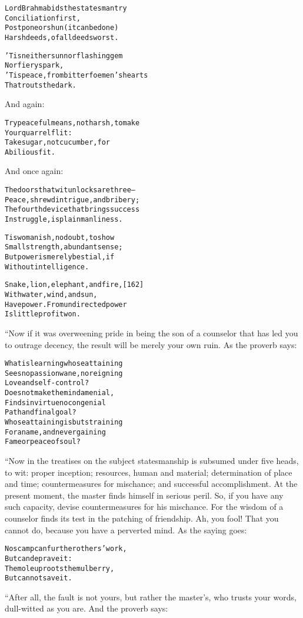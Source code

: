 \documentclass{article}
\renewenvironment{verbatim}{\begin{alltt}\normalfont\begin{centering}}{\end{centering}\end{alltt}}
\begin{document}
\begin{verbatim}
Lord Brahma bids the statesman try
    Conciliation first,
Postpone or shun (it can be done)
    Harsh deeds, of all deeds worst.

'Tis neither sun nor flashing gem
    Nor fiery spark,
'Tis peace, from bitter foemen's hearts
    That routs the dark.
\end{verbatim}
And again:

\begin{verbatim}
Try peaceful means, not harsh, to make
    Your quarrel flit:
Take sugar, not cucumber, for
    A bilious fit.
\end{verbatim}
And once again:

\begin{verbatim}
The doors that wit unlocks are three--
Peace, shrewd intrigue, and bribery;
The fourth device that brings success
In struggle, is plain manliness.

Tis womanish, no doubt, to show
    Small strength, abundant sense;
But power is merely bestial, if
    Without intelligence.

Snake, lion, elephant, and fire,                        [162]
    With water, wind, and sun,
Have power. From undirected power
    Is little profit won.
\end{verbatim}
“Now if it was overweening pride in being the son of a counselor
that has led you to outrage decency, the result will be merely your
own ruin. As the proverb says:

\begin{verbatim}
What is learning whose attaining
Sees no passion wane, no reigning
    Love and self-control?
Does not make the mind a menial,
Finds in virtue no congenial
    Path and final goal?
Whose attaining is but straining
For a name, and never gaining
    Fame or peace of soul?
\end{verbatim}
“Now in the treatises on the subject statesmanship is subsumed
under five heads, to wit: proper inception; resources, human and
material; determination of place and time; countermeasures for
mischance; and successful accomplishment. At the present moment,
the master finds himself in serious peril. So, if you have any such
capacity, devise countermeasures for his mischance. For the wisdom
of a counselor finds its test in the patching of friendship. Ah,
you fool! That you cannot do, because you have a perverted mind. As
the saying goes:

\begin{verbatim}
No scamp can further others' work,
    But can deprave it:
The mole uproots the mulberry,
    But cannot save it.
\end{verbatim}
“After all, the fault is not yours, but rather the master's, who
trusts your words, dull-witted as you are. And the proverb says:
\end{document}

